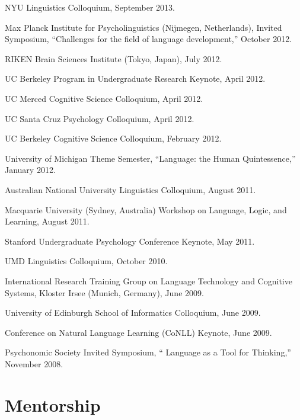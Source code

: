 \documentclass{article}
\renewenvironment{itemize}{
\begin{list}{}{
  \setlength{\leftmargin}{1.5em}
  }
  }{
\end{list}
}
\begin{document}
\begin{itemize}
  \item NYU Linguistics Colloquium, September 2013.
  \item Max Planck Institute for Psycholinguistics (Nijmegen, Netherlands), Invited Symposium, ``Challenges for the field of language development,'' October 2012.
  \item RIKEN Brain Sciences Institute (Tokyo, Japan), July 2012.
  \item UC Berkeley Program in Undergraduate Research Keynote, April 2012.
  \item UC Merced Cognitive Science Colloquium, April 2012.
  \item UC Santa Cruz Psychology Colloquium, April 2012.
  \item UC Berkeley Cognitive Science Colloquium, February 2012.
  \item University of Michigan Theme Semester, ``Language: the Human Quintessence,'' January 2012.
  \item Australian National University Linguistics Colloquium, August 2011.
  \item Macquarie University (Sydney, Australia) Workshop on Language, Logic, and Learning, August 2011.
  \item Stanford Undergraduate Psychology Conference Keynote, May 2011.
  \item UMD Linguistics Colloquium, October 2010.
  \item International Research Training Group on Language Technology and Cognitive Systems, Kloster Irsee (Munich, Germany), June 2009.
  \item University of Edinburgh School of Informatics Colloquium, June 2009.
  \item Conference on Natural Language Learning (CoNLL) Keynote, June 2009.
  \item Psychonomic Society Invited Symposium, `` Language as a Tool for Thinking,'' November 2008.
\end{itemize}

\section*{Mentorship}
\end{document}
